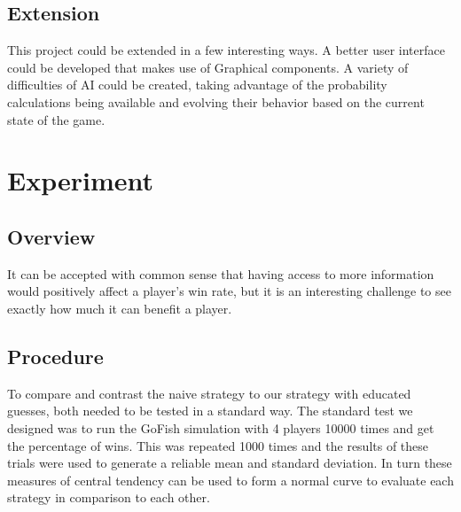 \documentclass[preprint,12pt]{elsarticle}
\begin{document}
\subsection{Extension} 
This project could be extended in a few interesting ways. A better user interface could be developed that makes use of Graphical components. A variety of difficulties of AI could be created, taking advantage of the probability calculations being available and evolving their behavior based on the current state of the game.

\section{Experiment}
\label{S:2}
\subsection{Overview}
It can be accepted with common sense that having access to more information would positively affect a player's win rate, but it is an interesting challenge to see exactly how much it can benefit a player.

\subsection{Procedure}
To compare and contrast the naive strategy to our strategy with educated guesses, both needed to be tested in a standard way. The standard test we designed was to run the GoFish simulation with 4 players 10000 times and get the percentage of wins. This was repeated 1000 times and the results of these trials were used to generate a reliable mean and standard deviation. In turn these measures of central tendency can be used to form a normal curve to evaluate each strategy in comparison to each other.
\end{document}

